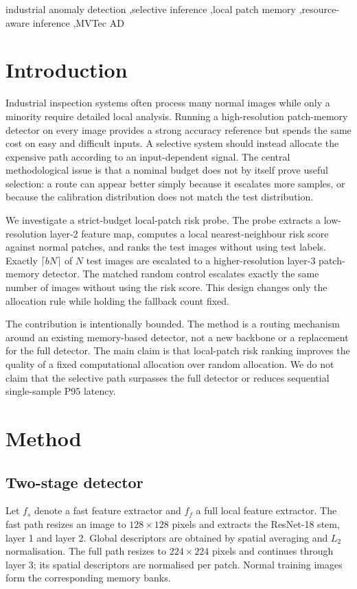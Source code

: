 \documentclass[preprint,12pt]{elsarticle}
\begin{document}
\begin{frontmatter}
\begin{keyword}
industrial anomaly detection \sep selective inference \sep local patch memory \sep resource-aware inference \sep MVTec AD
\end{keyword}
\end{frontmatter}

\section{Introduction}
Industrial inspection systems often process many normal images while only a minority require detailed local analysis. Running a high-resolution patch-memory detector on every image provides a strong accuracy reference but spends the same cost on easy and difficult inputs. A selective system should instead allocate the expensive path according to an input-dependent signal. The central methodological issue is that a nominal budget does not by itself prove useful selection: a route can appear better simply because it escalates more samples, or because the calibration distribution does not match the test distribution.

We investigate a strict-budget local-patch risk probe. The probe extracts a low-resolution layer-2 feature map, computes a local nearest-neighbour risk score against normal patches, and ranks the test images without using test labels. Exactly $\lceil bN\rceil$ of $N$ test images are escalated to a higher-resolution layer-3 patch-memory detector. The matched random control escalates exactly the same number of images without using the risk score. This design changes only the allocation rule while holding the fallback count fixed.

The contribution is intentionally bounded. The method is a routing mechanism around an existing memory-based detector, not a new backbone or a replacement for the full detector. The main claim is that local-patch risk ranking improves the quality of a fixed computational allocation over random allocation. We do not claim that the selective path surpasses the full detector or reduces sequential single-sample P95 latency.

\section{Method}
\subsection{Two-stage detector}
Let $f_s$ denote a fast feature extractor and $f_f$ a full local feature extractor. The fast path resizes an image to $128\times128$ pixels and extracts the ResNet-18 stem, layer 1 and layer 2. Global descriptors are obtained by spatial averaging and $L_2$ normalisation. The full path resizes to $224\times224$ pixels and continues through layer 3; its spatial descriptors are normalised per patch. Normal training images form the corresponding memory banks.
\end{document}
